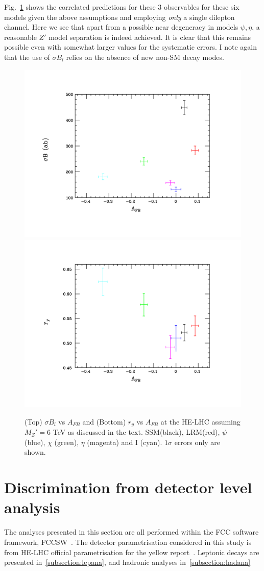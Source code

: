 \documentclass[14pt]{article}
\begin{document}
Fig.~\ref{toy3} shows the correlated predictions for these 3 observables for these six models given the above assumptions and employing {\it only} a single dilepton 
channel. Here we see that apart from a possible near degeneracy in models $\psi,\eta$, a reasonable $Z'$ model separation is indeed achieved. It is clear that this 
remains possible even with somewhat larger values for the systematic errors. I note again that the use of $\sigma B_l$ relies on the absence of new non-SM decay 
modes.



\begin{figure}[htbp]
  \centering
\includegraphics[trim={2cm 2cm 2cm 2cm},clip,width=0.49\columnwidth]{figures/compare2.pdf}
\includegraphics[trim={2cm 2cm 2cm 2cm},clip,width=0.49\columnwidth]{figures/compare3.pdf}
\caption{(Top) $\sigma B_l$ vs $A_{FB}$ and (Bottom) $r_y$ vs $A_{FB}$ at the HE-LHC assuming $M_Z'=6$ TeV as discussed in the text. 
SSM(black), LRM(red), $\psi$ (blue), $\chi$ (green), $\eta$ (magenta) and I (cyan). $1\sigma$ errors only are shown. }
\label{toy3}
\end{figure}




\section{Discrimination from detector level analysis}
The analyses presented in this section are all performed within the FCC software framework, FCCSW~\cite{fccsw}.
The detector parametrisation considered in this study is from HE-LHC official parametrisation for the yellow report~\cite{HELHCtwiki}.
Leptonic decays are presented in~\ref{subsection:lepana}, and hadronic analyses in~\ref{subsection:hadana}
\end{document}
